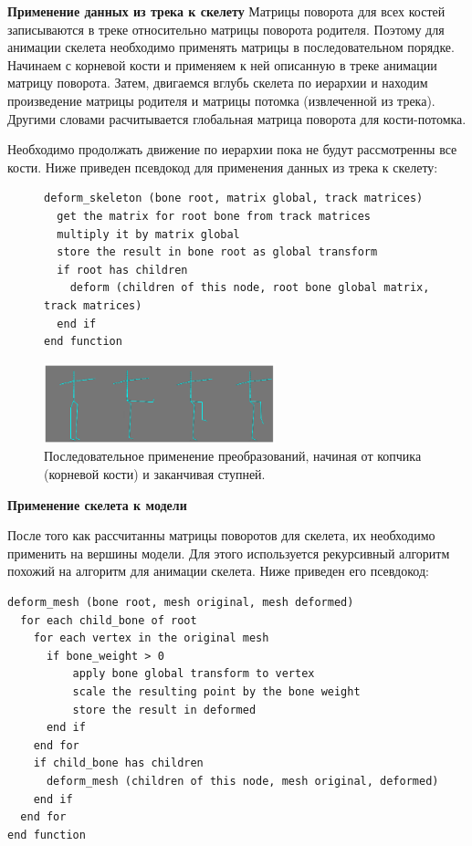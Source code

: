 \textbf{Применение данных из трека к скелету}
Матрицы поворота для всех костей записываются в треке относительно матрицы поворота родителя.
Поэтому для анимации скелета необходимо применять матрицы в последовательном порядке.
Начинаем с корневой кости и применяем к ней описанную в треке анимации матрицу поворота.
Затем, двигаемся вглубь скелета по иерархии и находим произведение матрицы родителя и матрицы потомка (извлеченной из трека). Другими словами расчитывается глобальная матрица поворота для кости-потомка.

Необходимо продолжать движение по иерархии пока не будут рассмотренны все кости. Ниже приведен псевдокод для применения данных из трека к скелету:

\begin{figure}[h!]
\begin{small}
\begin{verbatim}
deform_skeleton (bone root, matrix global, track matrices)
  get the matrix for root bone from track matrices
  multiply it by matrix global
  store the result in bone root as global transform
  if root has children
    deform (children of this node, root bone global matrix, track matrices)
  end if
end function
\end{verbatim}
\end{small}
\end{figure}

\begin{figure}[h!]
    \centering
    \includegraphics[width=0.6\textwidth]{forward_kinematics_skeleton.png}
    \caption{\small{Последовательное применение преобразований, начиная от копчика (корневой кости) и заканчивая ступней.}}
\end{figure}


\textbf{Применение скелета к модели}

После того как рассчитанны матрицы поворотов для скелета, их необходимо применить на вершины модели.
Для этого используется рекурсивный алгоритм похожий на алгоритм для анимации скелета. Ниже приведен его псевдокод:

\begin{small}
\begin{verbatim}
deform_mesh (bone root, mesh original, mesh deformed)
  for each child_bone of root
    for each vertex in the original mesh
      if bone_weight > 0
          apply bone global transform to vertex
          scale the resulting point by the bone weight
          store the result in deformed
      end if
    end for
    if child_bone has children
      deform_mesh (children of this node, mesh original, deformed)
    end if
  end for
end function
\end{verbatim}
\end{small}

